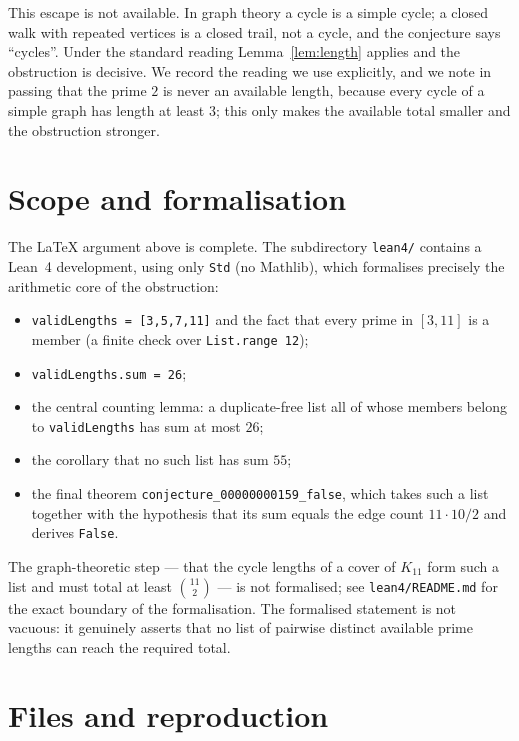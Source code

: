 \documentclass[11pt]{article}
\theoremstyle{definition}
\theoremstyle{remark}
\begin{document}
This escape is not available. In graph theory a cycle is a simple cycle; a
closed walk with repeated vertices is a closed trail, not a cycle, and the
conjecture says ``cycles''. Under the standard reading Lemma~\ref{lem:length}
applies and the obstruction is decisive. We record the reading we use
explicitly, and we note in passing that the prime $2$ is never an available
length, because every cycle of a simple graph has length at least $3$; this
only makes the available total smaller and the obstruction stronger.

\section{Scope and formalisation}

The LaTeX argument above is complete. The subdirectory \texttt{lean4/}
contains a Lean~4 development, using only \texttt{Std} (no Mathlib), which
formalises precisely the arithmetic core of the obstruction:

\begin{itemize}
\item \texttt{validLengths = [3,5,7,11]} and the fact that every prime in
      $[3,11]$ is a member (a finite check over \texttt{List.range 12});
\item \texttt{validLengths.sum = 26};
\item the central counting lemma: a duplicate-free list all of whose members
      belong to \texttt{validLengths} has sum at most $26$;
\item the corollary that no such list has sum $55$;
\item the final theorem \texttt{conjecture\_00000000159\_false}, which takes
      such a list together with the hypothesis that its sum equals the edge
      count $11 \cdot 10 / 2$ and derives \texttt{False}.
\end{itemize}

The graph-theoretic step --- that the cycle lengths of a cover of $K_{11}$ form
such a list and must total at least $\binom{11}{2}$ --- is not formalised; see
\texttt{lean4/README.md} for the exact boundary of the formalisation. The
formalised statement is not vacuous: it genuinely asserts that no list of
pairwise distinct available prime lengths can reach the required total.

\section{Files and reproduction}
\end{document}
